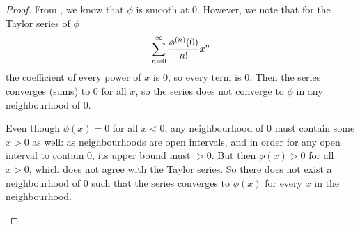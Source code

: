 \begin{proof}
  From , we know that $\phi$ is smooth at 0. However, we note that for the Taylor series of $\phi$
  \[
    \sumto[0]{n}{\infty} \frac{\phi ^ {(n)} (0)}{n!} x ^ n
  \]
  the coefficient of every power of $x$ is 0, so every term is 0. Then the series converges (sums) to 0 for all $x$, so the series does not converge to $\phi$ in any neighbourhood of 0. 
  \begin{intuition}
    Even though $\phi(x) = 0$ for all $x < 0$, any neighbourhood of 0 must contain some $x > 0$ as well: as neighbourhoods are open intervals, and in order for any open interval to contain 0, its upper bound must $> 0$. But then $\phi(x) > 0$ for all $x > 0$, which does not agree with the Taylor series. So there does not exist a neighbourhood of 0 such that the series converges to $\phi(x)$ for every $x$ in the neighbourhood.
  \end{intuition}
\end{proof}



